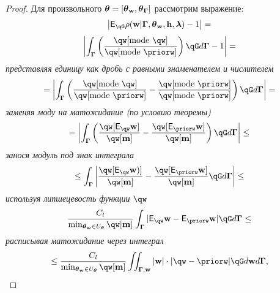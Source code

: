 \begin{proof}
Для произвольного $\boldsymbol{\theta}=[\boldsymbol{\theta}_\mathbf{w}, \boldsymbol{\theta}_{\boldsymbol{\Gamma}}]$ рассмотрим выражение:
\[
   \left|\E_{\qG} {\rho}(\w|\G, \tetaw, \h, \lam) - 1\right| =
\]
\[
   \left|\int_{\G} \left(\frac{\qw[\text{mode}~\qw]}{\qw[\text{mode}~\priorw]} \right)\qG d\G  - 1 \right| =
\]
\textit{представляя единицу как дробь с равными знаменателем и числителем}
\[
 =  \left|\int_{\G} \left(\frac{\qw[\text{mode}~\qw]}{\qw[\text{mode}~\priorw]} -  \frac{\qw[\text{mode}~\priorw]}{\qw[\text{mode}~\priorw]} \right)\qG d\G \right| =
\]
\textit{заменяя моду на матожидание (по условию теоремы)}
\[  = \left|\int_{\G} \left( \frac{\qw[\E_{\qw}\w]}{\qw[\mathbf{m}]} -  \frac{\qw[\E_{\priorw} \w]}{\qw[\mathbf{m}]} \right) \qG d\G\right| \leq 
\]
\textit{занося модуль под знак интеграла}
\[
\leq 
\int_{\G} \left|\frac{\qw[\E_{\qw} \w)]}{{\qw[\mathbf{m}]}} -   \frac{\qw[\E_{\priorw} \w]}{\qw[\mathbf{m}]}\qG d\G\right| \leq
\]
\textit{используя липшецевость функции }$\qw$
\[
\frac{C_l}{\min_{\tetaw \in \Uteta} \qw[\mathbf{m}]}\int_{\G}  |\E_{\qw}\w - \E_{\priorw}\w|\qG d\G  \leq
\]
\textit{расписывая матожидание через интеграл}
\[
    \leq \frac{C_l}{\min_{\tetaw \in \Uteta} \qw[\mathbf{m}]} \iint_{\G,\w} |\w| \cdot |\qw - \priorw|\qG d\w d\G,
\] 
\end{proof}



